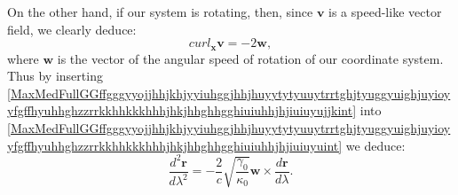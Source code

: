 \documentclass{article}
\theoremstyle{definition}
\theoremstyle{remark}
\renewcommand{\vec}[1]{\mathbf{#1}}
\newcommand{\er}{\eqref}
\newcommand{\er}{\eqref}
\begin{document}
On the other hand, if our system is rotating, then, since $\vec v$
is a speed-like vector field, we clearly deduce:
\begin{equation}\label{MaxMedFullGGffgggyyojjhhjkhjyyiuhggjhhjhuyytytyuuytrrtghjtyuggyuighjuyioyyfgffhyuhhghzzrrkkhhkkkhhhjhkjhhghhgghiuiuhhjhjiuiuyujjkint}
curl_{\vec x}\vec v=-2\vec w,
\end{equation}
where $\vec w$ is the vector of the angular speed of rotation of our
coordinate system. Thus by inserting
\er{MaxMedFullGGffgggyyojjhhjkhjyyiuhggjhhjhuyytytyuuytrrtghjtyuggyuighjuyioyyfgffhyuhhghzzrrkkhhkkkhhhjhkjhhghhgghiuiuhhjhjiuiuyujjkint}
into
\er{MaxMedFullGGffgggyyojjhhjkhjyyiuhggjhhjhuyytytyuuytrrtghjtyuggyuighjuyioyyfgffhyuhhghzzrrkkhhkkkhhhjhkjhhghhgghiuiuhhjhjiuiuyuint}
we deduce:
\begin{equation}\label{MaxMedFullGGffgggyyojjhhjkhjyyiuhggjhhjhuyytytyuuytrrtghjtyuggyuighjuyioyyfgffhyuhhghzzrrkkhhkkkhhhjhkjhhghhgghiuiuhhjhjiuiuyuyyuint}
\frac{d^2\vec
r}{d\lambda^2}=-\frac{2}{c}\sqrt{\frac{\gamma_0}{\kappa_0}}\vec
w\times\frac{d\vec r}{d\lambda}.
\end{equation}
%
%
%
\begin{comment}
In particular, by
\er{MaxMedFullGGffgggyyojjhhjkhjyyiuhggjhhjhuyytytyuuytrrtghjtyuggyuighjuyioyyfgffhyuhhghzzrrkkhhkkkhhhjhkjhhghhgghiuiuhhjhjiuiuyuyyuint}
if we consider that $\vec w=(0,0,w)$ and $\vec r=(x,y,z)$, then
there exist three dimensionless constants $C_1$, $C_2$ and $C_3$
such that
\begin{equation}\label{MaxMedFullGGffgggyyojjhhjkhjyyiuhggjhhjhuyytytyuuytrrtghjtyuggyuighjuyioyyfgffhyuhhghzzrrkkhhkkkhhhjhkjhhghhgghiuiuhhjhjiuiuyuyyukklint}
\begin{cases}
\frac{dx}{d\lambda}=-C_1\sin{\left(\frac{2w}{c}\sqrt{\frac{\gamma_0}{\kappa_0}}\lambda\right)}+C_2\cos{\left(\frac{2w}{c}\sqrt{\frac{\gamma_0}{\kappa_0}}\lambda\right)}
\\
\frac{dy}{d\lambda}=-C_1\cos{\left(\frac{2w}{c}\sqrt{\frac{\gamma_0}{\kappa_0}}\lambda\right)}-C_2\sin{\left(\frac{2w}{c}\sqrt{\frac{\gamma_0}{\kappa_0}}\lambda\right)}
\\
\frac{dz}{d\lambda}=C_3,
\end{cases}
\end{equation}
and moreover, since $\lambda$ is a natural parameter, the constants
satisfy:
\begin{equation}\label{MaxMedFullGGffgggyyojjhhjkhjyyiuhggjhhjhuyytytyuuytrrtghjtyuggyuighjuyioyyfgffhyuhhghzzrrkkhhkkkhhhjhkjhhghhgghiuiuhhjhjiuiuyuyyuojkint}
C^2_1+C^2_2+C^2_3=1.
\end{equation}
Then by
\er{MaxMedFullGGffgggyyojjhhjkhjyyiuhggjhhjhuyytytyuuytrrtghjtyuggyuighjuyioyyfgffhyuhhghzzrrkkhhkkkhhhjhkjhhghhgghiuiuhhjhjiuiuyuyyukklint}
there exist three additional constants $D_1$, $D_2$ and $D_3$ such
that
\end{comment}
\end{document}
